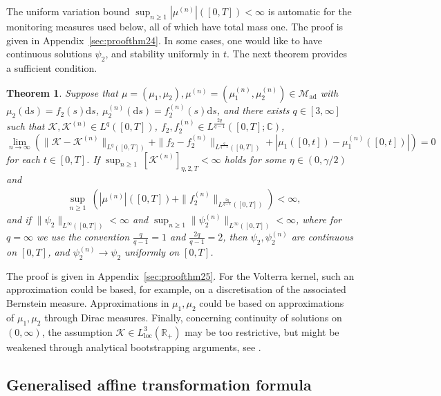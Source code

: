 \documentclass[10pt,a4paper,reqno]{amsart}
\newcommand{\R}{\mathbb{R}}
\newcommand{\C}{\mathbb{C}}
\theoremstyle{plain}
\newtheorem{theorem}{Theorem}[section]
\theoremstyle{definition}
\theoremstyle{remark}
\theoremstyle{example}
\begin{document}
The uniform variation bound $\sup_{n\ge1}|\mu^{(n)}|([0,T])<\infty$ is automatic for the monitoring measures used below, all of which have total mass one. The proof is given in Appendix~\ref{sec:proofthm24}. In some cases, one would like to have continuous solutions $\psi_2$, and stability uniformly in $t$. The next theorem provides a sufficient condition.

\begin{theorem}\label{thm:stability-uniform}
    Suppose that $\mu = (\mu_1, \mu_2), \mu^{(n)} = (\mu^{(n)}_1, \mu^{(n)}_2) \in \mathcal{M}_{\mathrm{ad}}$ with $\mu_2(\mathrm{d}s) = f_2(s)\mathrm{d}s$, $\mu_2^{(n)}(\mathrm{d}s) = f_2^{(n)}(s)\mathrm{d}s$, and there exists $q \in [3, \infty]$ such that $\mathcal{K}, \mathcal{K}^{(n)} \in L^q([0,T])$, $f_2, f_2^{(n)} \in L^{\frac{2q}{q-1}}([0,T]; \C)$,
    $$
        \lim_{n \to \infty}\left(\| \mathcal{K} - \mathcal{K}^{(n)}\|_{L^q([0,T])} + \| f_2 - f_2^{(n)}\|_{L^{\frac{q}{q-1}}([0,T]) } + |\mu_1([0,t]) - \mu^{(n)}_1([0,t])| \right) = 0
    $$
    for each $t \in [0,T]$. If $\sup_{n \geq 1}\  [\mathcal{K}^{(n)}]_{\eta,2,T} < \infty$ holds for some $\eta \in (0,\gamma/2)$ and
    \begin{align*}
        &\sup_{n \geq 1}\  \left( |\mu^{(n)}|([0,T]) + \| f_2^{(n)}\|_{L^{\frac{2q}{q-1}}([0,T])}\right) < \infty,
	    \end{align*}
	    and if $\|\psi_2\|_{L^\infty([0,T])}<\infty$ and $\sup_{n\ge1}\|\psi_2^{(n)}\|_{L^\infty([0,T])}<\infty$, where for $q=\infty$ we use the convention $\frac{q}{q-1}=1$ and $\frac{2q}{q-1}=2$, then $\psi_2, \psi_2^{(n)}$ are continuous on $[0,T]$, and $\psi_2^{(n)} \longrightarrow \psi_2$ uniformly on $[0,T]$. 
\end{theorem}

 The proof is given in Appendix~\ref{sec:proofthm25}. For the Volterra kernel, such an approximation could be based, for example, on a discretisation of the associated Bernstein measure. Approximations in $\mu_1, \mu_2$ could be based on approximations of $\mu_1, \mu_2$ through Dirac measures. Finally, concerning continuity of solutions on $(0,\infty)$, the assumption $\mathcal{K} \in L_{\mathrm{loc}}^3(\R_+)$ may be too restrictive, but might be weakened through analytical bootstrapping arguments, see \cite[Section 2]{FKW26}.

\subsection{Generalised affine transformation formula}\label{sec:affine-transform-formula}
\end{document}
